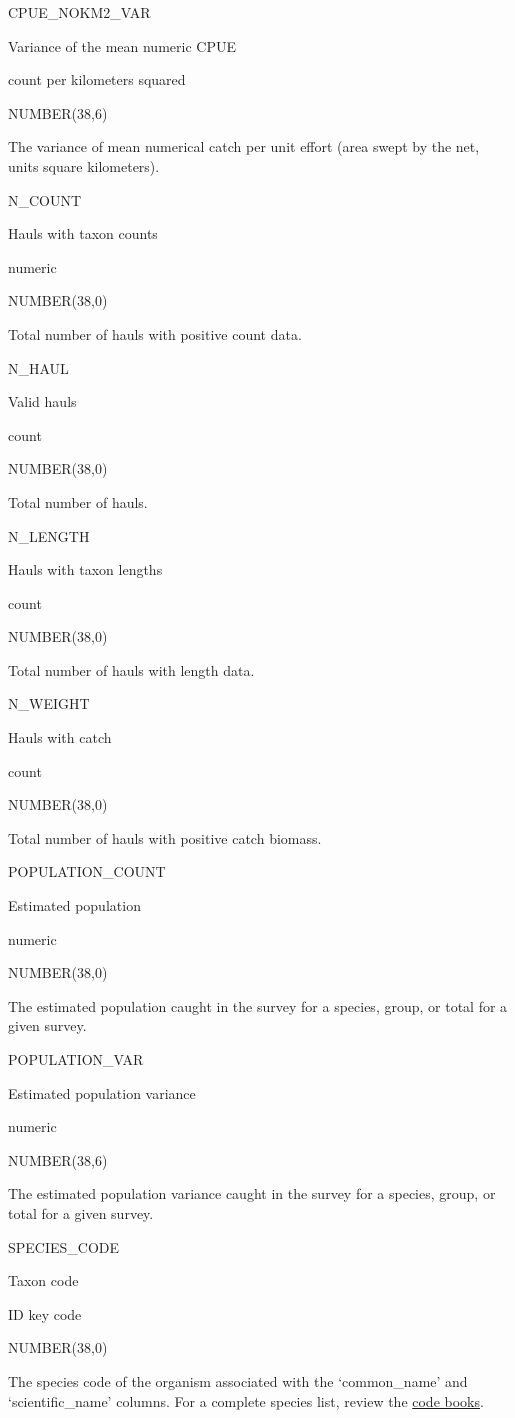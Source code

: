 \documentclass[
  letterpaper,
  oneside,
  open=any]{scrbook}
\begin{document}
CPUE\_NOKM2\_VAR

Variance of the mean numeric CPUE

count per kilometers squared

NUMBER(38,6)

The variance of mean numerical catch per unit effort (area swept by the
net, units square kilometers).

N\_COUNT

Hauls with taxon counts

numeric

NUMBER(38,0)

Total number of hauls with positive count data.

N\_HAUL

Valid hauls

count

NUMBER(38,0)

Total number of hauls.

N\_LENGTH

Hauls with taxon lengths

count

NUMBER(38,0)

Total number of hauls with length data.

N\_WEIGHT

Hauls with catch

count

NUMBER(38,0)

Total number of hauls with positive catch biomass.

POPULATION\_COUNT

Estimated population

numeric

NUMBER(38,0)

The estimated population caught in the survey for a species, group, or
total for a given survey.

POPULATION\_VAR

Estimated population variance

numeric

NUMBER(38,6)

The estimated population variance caught in the survey for a species,
group, or total for a given survey.

SPECIES\_CODE

Taxon code

ID key code

NUMBER(38,0)

The species code of the organism associated with the `common\_name' and
`scientific\_name' columns. For a complete species list, review the
\href{https://www.fisheries.noaa.gov/resource/document/groundfish-survey-species-code-manual-and-data-codes-manual}{code
books}.
\end{document}
